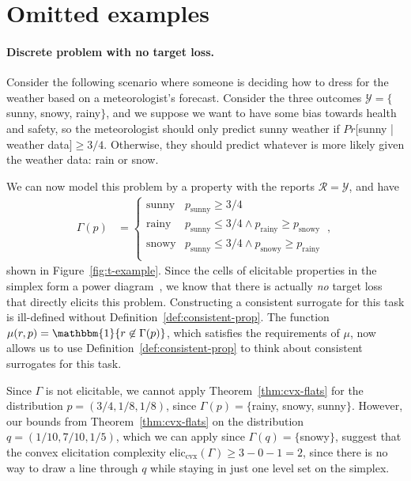 \documentclass{article}
\newcommand{\eliccvx}{\mathrm{elic}_\mathrm{cvx}}
\newcommand{\propdis}{\mu}
\newcommand{\R}{\mathcal{R}}
\newcommand{\Y}{\mathcal{Y}}
\newcommand{\ones}{\mathbbm{1}}
\begin{document}
\section{Omitted examples}
\paragraph{Discrete problem with no target loss.}
Consider the following scenario where someone is deciding how to dress for the weather based on a meteorologist's forecast.
Consider the three outcomes $\Y = \{$sunny, snowy, rainy$\}$, and we suppose we want to have some bias towards health and safety, so the meteorologist should only predict sunny weather if $Pr[$sunny | weather data$] \geq 3/4$.
Otherwise, they should predict whatever is more likely  given the weather data: rain or snow.

We can now model this problem by a property with the reports $\R = \Y$, and have 
\begin{align*}
\Gamma(p) &= \begin{cases}
\text{sunny} & p_{\text{sunny}} \geq 3/4 \\
\text{rainy} & p_{\text{sunny}} \leq 3/4 \wedge p_{\text{rainy}} \geq p_{\text{snowy}} \\
\text{snowy} & p_{\text{sunny}} \leq 3/4 \wedge p_{\text{snowy}} \geq p_{\text{rainy}} \\
\end{cases}~,~
\end{align*} 
shown in Figure~\ref{fig:t-example}.
Since the cells of elicitable properties in the simplex form a power diagram~\citep{lambert2009eliciting}, we know that there is actually \emph{no} target loss that directly elicits this problem.
Constructing a consistent surrogate for this task is ill-defined without Definition~\ref{def:consistent-prop}.
The function $\propdis(r,p) = \ones\{r \not \in \Gamma(p)\}$, which satisfies the requirements of $\propdis$, now allows us to use Definition~\ref{def:consistent-prop} to think about consistent surrogates for this task.

Since $\Gamma$ is not elicitable, we cannot apply Theorem~\ref{thm:cvx-flats} for the distribution $p = (3/4, 1/8,1/8)$, since $\Gamma(p) = \{$rainy, snowy, sunny$\}$.
However, our bounds from Theorem~\ref{thm:cvx-flats} on the distribution $q = (1/10, 7/10, 1/5)$, which we can apply since $\Gamma(q) = \{$snowy$\}$, suggest that the convex elicitation complexity $\eliccvx(\Gamma) \geq 3 - 0 -1 = 2$, since there is no way to draw a line through $q$ while staying in just one level set on the simplex.
\end{document}
